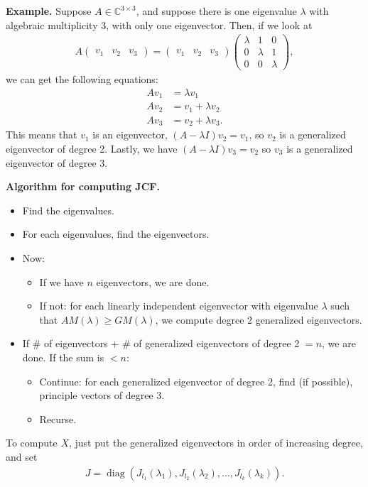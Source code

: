 \documentclass{article}
\newcommand{\mat}[1]{\begin{pmatrix}#1\end{pmatrix}}
\newcommand{\CC}{\mathbb{C}}
\DeclareMathOperator{\diag}{diag}
\begin{document}
{\bf Example.} Suppose $A \in \CC^{3 \times 3}$, and suppose there is one eigenvalue $\lambda$ with algebraic multiplicity 3, with only one eigenvector.  Then, if we look at 
\begin{align*}
  A \mat{v_1 & v_2 & v_3}  = \mat{v_1 & v_2 & v_3 }  \mat{\lambda & 1 & 0 \\ 0 & \lambda & 1 \\ 0 & 0 & \lambda},
\end{align*}
we can get the following equations:
\begin{align*}
  A v_1 &= \lambda v_1 \\
  A v_2 &= v_1 + \lambda v_2 \\
  A v_3 &= v_2 + \lambda v_3.
\end{align*}
This means that $v_1$ is an eigenvector, $(A - \lambda I) v_2 = v_1$, so $v_2$ is a generalized eigenvector of degree 2.  Lastly, we have $(A - \lambda I) v_3 = v_2$ so $v_3$ is a generalized eigenvector of degree 3.

{\bf Algorithm for computing JCF.}

\begin{itemize}
  \item Find the eigenvalues.
  \item For each eigenvalues, find the eigenvectors.
  \item Now:
    \begin{itemize}
      \item If we have $n$ eigenvectors, we are done.
      \item If not: for each linearly independent eigenvector with eigenvalue $\lambda$ such that $AM(\lambda) \geq GM(\lambda)$, we compute degree 2 generalized eigenvectors.
    \end{itemize}
  \item If \# of eigenvectors + \# of generalized eigenvectors of degree 2 $= n$, we are done.  If the sum is $< n$:
    \begin{itemize}
      \item Continue: for each generalized eigenvector of degree 2, find (if possible), principle vectors of degree 3.
      \item Recurse.
    \end{itemize}
\end{itemize}

To compute $X$, just put the generalized eigenvectors in order of increasing degree, and set
\begin{align*}
  J = \diag(J_{l_1}(\lambda_1), J_{l_2} (\lambda_2), \dots, J_{l_k}(\lambda_k)).
\end{align*}
\end{document}
